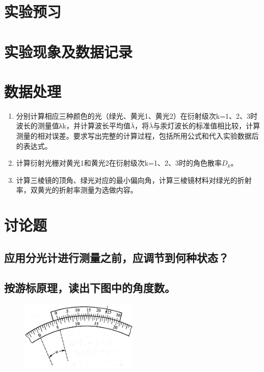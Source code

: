\documentclass[signature=data]{physicsreport}
\begin{document}
\maketitle
\section{实验预习}
\newpage

\section{实验现象及数据记录}
\makeatletter
{}
\makeatother

\newpage



\section{数据处理}

\begin{enumerate}
    \item 分别计算相应三种颜色的光（绿光、黄光1、黄光2）在衍射级次k=1、2、3时波长的测量值λk，并计算波长平均值$\overline \lambda$，将$\overline \lambda$与汞灯波长的标准值相比较，计算测量的相对误差。要求写出完整的计算过程，包括所用公式和代入实验数据后的表达式。
    \item 计算衍射光栅对黄光1和黄光2在衍射级次k=1、2、3时的角色散率$D_k$。
    \item 计算三棱镜的顶角、绿光对应的最小偏向角，计算三棱镜材料对绿光的折射率，双黄光的折射率测量为选做内容。
\end{enumerate}




\pagebreak
\section{讨论题}

\subsection{应用分光计进行测量之前，应调节到何种状态？}



\subsection{按游标原理，读出下图中的角度数。}

\begin{figure}[H]
    \centering
    \includegraphics[width=0.5\textwidth]{images/lab13/image.png}
    \label{fig:lab13-fig1}
\end{figure}
\end{document}
